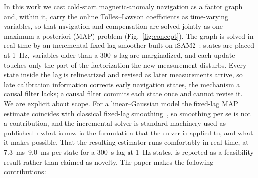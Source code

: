 \documentclass{IEEEtaes}
\begin{document}
In this work we cast cold-start magnetic-anomaly navigation as a factor graph
and, within it, carry the online Tolles--Lawson coefficients as time-varying
variables, so that navigation and compensation are solved jointly as one
maximum-a-posteriori (MAP) problem (Fig.~\ref{fig:concept}). The graph is
solved in real time by an incremental fixed-lag smoother built on
iSAM2~\cite{kaess2012}: states are placed at \SI{1}{\hertz}, variables older
than a \SI{300}{\second} lag are marginalized, and each update touches only the
part of the factorization the new measurement disturbs. Every state inside the
lag is relinearized and revised as later measurements arrive, so late
calibration information corrects early navigation states, the mechanism a
causal filter lacks; a causal filter commits each state once and cannot revise
it. We are explicit about scope. For a linear--Gaussian model the fixed-lag MAP
estimate coincides with classical fixed-lag smoothing~\cite{rauch1965}, so
smoothing per se is not a contribution, and the incremental solver is standard
machinery used as published~\cite{kaess2012}: what is new is the formulation
that the solver is applied to, and what it makes possible. That the resulting
estimator runs comfortably in real time, at \SIrange{7.3}{9.0}{\milli\second}
per state for a \SI{300}{\second} lag at \SI{1}{\hertz} states, is reported as
a feasibility result rather than claimed as novelty.
The paper makes the following contributions:
\end{document}
